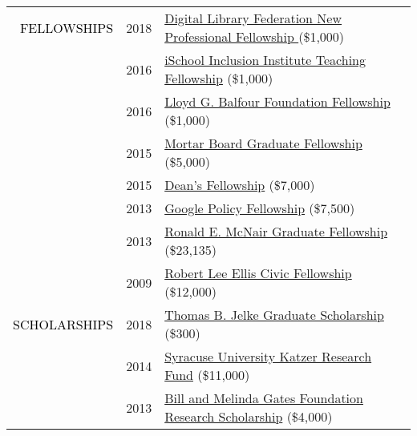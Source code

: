 \documentclass[12pt]{article}
\begin{document}
{{\begin{longtable}{Rp{1.0in}p{0.25in}p{4.75in}}
\textcolor{black}{\footnotesize{\uppercase{Fellowships}}} & \footnotesize{2018} & \href{https://forum2018.diglib.org/fellowship-opportunities/fellows/}{{Digital Library Federation New Professional Fellowship }}(\$1,000) \\

& \footnotesize{2016} & \href{http://www.sis.pitt.edu/i3/phd-fellows/fellow-profiles.html}{{iSchool Inclusion Institute Teaching Fellowship}} (\$1,000) \\

& \footnotesize{2016} & \href{https://www.bankofamerica.com/philanthropic/foundation.go?fnId=31}{{Lloyd G. Balfour Foundation Fellowship}} (\$1,000) \\

& \footnotesize{2015} & \href{https://news.syr.edu/2015/07/ischool-student-awarded-5000-mortar-board-fellowship-22021/}{{Mortar Board Graduate Fellowship}} (\$5,000) \\

& \footnotesize{2015} & \href{https://news.syr.edu/2012/04/ischool-advisersu-trustee-creates-new-summer-ph-d-fellowships/}{{Dean’s Fellowship}} (\$7,000) \\

& \footnotesize{2013} & \href{https://www.google.com/policyfellowship/2013fellows.html}{{Google Policy Fellowship}} (\$7,500) \\

& \footnotesize{2013} & \href{https://www.syracuse.edu/admissions/cost-and-aid/types-of-aid/graduate-student-aid/fellowships/}{{Ronald E. McNair Graduate Fellowship}} (\$23,135) \\

& \footnotesize{2009} & \href{http://www.washington.edu/carlson/ellis-civic-fellowship/}{{Robert Lee Ellis Civic Fellowship}} (\$12,000) \\

\textcolor{black}{\footnotesize{\uppercase{Scholarships}}} & \footnotesize{2018} & \href{https://www.afa1976.org/foundation}{{Thomas B. Jelke Graduate Scholarship}} (\$300) \\

& \footnotesize{2014} & \href{https://youtu.be/kFmO44rs3-c}{{Syracuse University Katzer Research Fund}} (\$11,000) \\

& \footnotesize{2013} & \href{https://expo.uw.edu/public/offering/271}{{Bill and Melinda Gates Foundation Research Scholarship}} (\$4,000) \\


\end{longtable}}}
\end{document}
